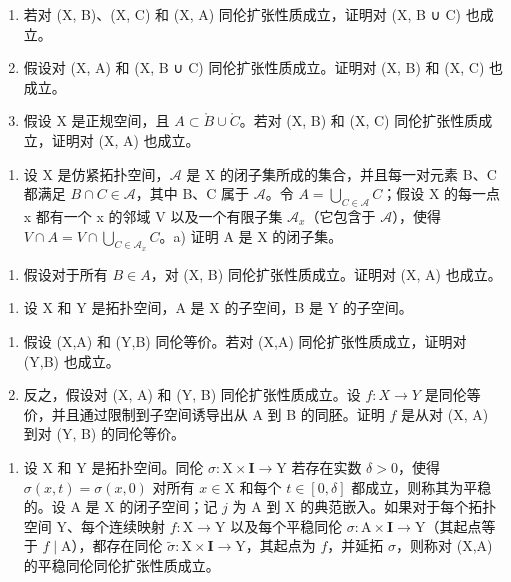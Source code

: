 \begin{enumerate}
\def\labelenumi{\alph{enumi})}
\item
  若对 (X, B)、(X, C) 和 (X, A) 同伦扩张性质成立，证明对 (X, B ∪ C) 也成立。
\item
  假设对 (X, A) 和 (X, B ∪ C) 同伦扩张性质成立。证明对 (X, B) 和 (X, C) 也成立。
\item
  假设 X 是正规空间，且 \(A \subset \mathring{B} \cup \mathring{C}\)。若对 (X, B) 和 (X, C) 同伦扩张性质成立，证明对 (X, A) 也成立。
\end{enumerate}

\begin{enumerate}
\def\labelenumi{\arabic{enumi})}
\setcounter{enumi}{20}
\tightlist
\item
  设 X 是仿紧拓扑空间，\(\mathcal{A}\) 是 X 的闭子集所成的集合，并且每一对元素 B、C 都满足 \(B \cap C \in \mathcal{A}\)，其中 B、C 属于 \(\mathcal{A}\)。令 \(A = \bigcup_{C \in \mathcal{A}} C\)；假设 X 的每一点 x 都有一个 x 的邻域 V 以及一个有限子集 \(\mathcal{A}_x\)（它包含于 \(\mathcal{A}\)），使得 \(V \cap A = V \cap \bigcup_{C \in \mathcal{A}_x} C\)。a) 证明 A 是 X 的闭子集。
\end{enumerate}

\begin{enumerate}
\def\labelenumi{\alph{enumi})}
\setcounter{enumi}{1}
\tightlist
\item
  假设对于所有 \(B \in A\)，对 (X, B) 同伦扩张性质成立。证明对 (X, A) 也成立。
\end{enumerate}

\begin{enumerate}
\def\labelenumi{\arabic{enumi})}
\setcounter{enumi}{21}
\tightlist
\item
  设 X 和 Y 是拓扑空间，A 是 X 的子空间，B 是 Y 的子空间。
\end{enumerate}

\begin{enumerate}
\def\labelenumi{\alph{enumi})}
\item
  假设 (X,A) 和 (Y,B) 同伦等价。若对 (X,A) 同伦扩张性质成立，证明对 (Y,B) 也成立。
\item
  反之，假设对 (X, A) 和 (Y, B) 同伦扩张性质成立。设 \(f \colon X \to Y\) 是同伦等价，并且通过限制到子空间诱导出从 A 到 B 的同胚。证明 \(f\) 是从对 (X, A) 到对 (Y, B) 的同伦等价。
\end{enumerate}

\begin{enumerate}
\def\labelenumi{\arabic{enumi})}
\setcounter{enumi}{22}
\tightlist
\item
  设 X 和 Y 是拓扑空间。同伦 \(\sigma\colon\mathrm{X}\times\mathbf{I}\to\mathrm{Y}\) 若存在实数 \(\delta>0\)，使得 \(\sigma(x,t)=\sigma(x,0)\) 对所有 \(x\in\mathrm{X}\) 和每个 \(t\in[0,\delta]\) 都成立，则称其为平稳的。设 A 是 X 的闭子空间；记 \(j\) 为 A 到 X 的典范嵌入。如果对于每个拓扑空间 Y、每个连续映射 \(f\colon\mathrm{X}\to\mathrm{Y}\) 以及每个平稳同伦 \(\sigma\colon\mathrm{A}\times\mathbf{I}\to\mathrm{Y}\)（其起点等于 \(f\mid\mathrm{A}\)），都存在同伦 \(\widetilde{\sigma}\colon\mathrm{X}\times\mathbf{I}\to\mathrm{Y}\)，其起点为 \(f\)，并延拓 \(\sigma\)，则称对 (X,A) 的平稳同伦同伦扩张性质成立。
\end{enumerate}

